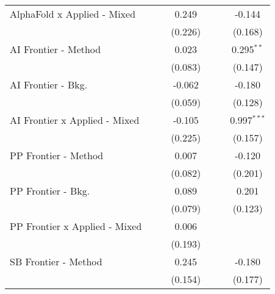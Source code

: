 \begin{tabular}{lcccccc}
   AlphaFold x Applied - Mixed   &               &              & 0.249          &               &              & -0.144\\   
                                 &               &              & (0.226)        &               &              & (0.168)\\   
   AI Frontier - Method          &               &              & 0.023          &               &              & 0.295$^{**}$\\   
                                 &               &              & (0.083)        &               &              & (0.147)\\   
   AI Frontier - Bkg.            &               &              & -0.062         &               &              & -0.180\\   
                                 &               &              & (0.059)        &               &              & (0.128)\\   
   AI Frontier x Applied - Mixed &               &              & -0.105         &               &              & 0.997$^{***}$\\   
                                 &               &              & (0.225)        &               &              & (0.157)\\   
   PP Frontier - Method          &               &              & 0.007          &               &              & -0.120\\   
                                 &               &              & (0.082)        &               &              & (0.201)\\   
   PP Frontier - Bkg.            &               &              & 0.089          &               &              & 0.201\\   
                                 &               &              & (0.079)        &               &              & (0.123)\\   
   PP Frontier x Applied - Mixed &               &              & 0.006          &               &              &   \\   
                                 &               &              & (0.193)        &               &              &   \\   
   SB Frontier - Method          &               &              & 0.245          &               &              & -0.180\\   
                                 &               &              & (0.154)        &               &              & (0.177)\\   

\end{tabular}
